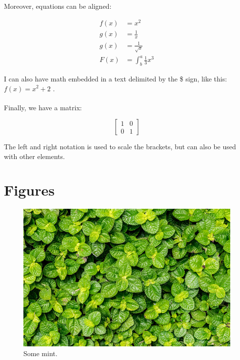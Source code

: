 \documentclass{book}
\begin{document}
Moreover, equations can be aligned:

\begin{align*}
f(x) &= x^2\\
g(x) &= \frac{1}{x}\\
g(x) &= \frac{1}{\sqrt{x}} \\
F(x) &= \int^a_b \frac{1}{3}x^3
\end{align*}

I can also have math embedded in a text delimited by the \$ sign, like this: $f(x) = x^2 + 2$ .

\paragraph{} 

Finally, we have a matrix:

\begin{equation*}
\left[
\begin{matrix}
1 & 0\\
0 & 1
\end{matrix}
\right]
\end{equation*}

The left and right notation is used to scale the brackets, but can also be used with other elements. 

\section{Figures}

\begin{figure}
  \includegraphics[width=\linewidth]{mint.jpg}
  \caption{Some mint.}
  \label{fig:mint1}
\end{figure}
\end{document}
